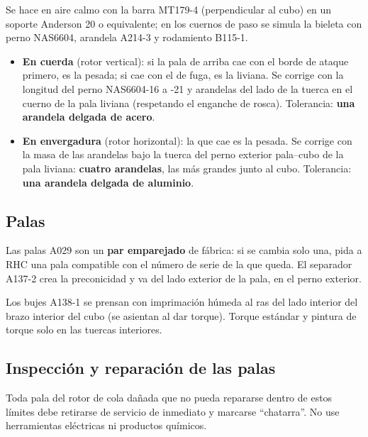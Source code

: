 Se hace en aire calmo con la barra MT179-4 (perpendicular al cubo) en un soporte Anderson 20 o equivalente; en los cuernos de paso se simula la bieleta con perno NAS6604, arandela A214-3 y rodamiento B115-1.

\begin{itemize}
\item \textbf{En cuerda} (rotor vertical): si la pala de arriba cae con el borde de ataque primero, es la pesada; si cae con el de fuga, es la liviana. Se corrige con la longitud del perno NAS6604-16 a -21 y arandelas del lado de la tuerca en el cuerno de la pala liviana (respetando el enganche de rosca). Tolerancia: \textbf{una arandela delgada de acero}.
\item \textbf{En envergadura} (rotor horizontal): la que cae es la pesada. Se corrige con la masa de las arandelas bajo la tuerca del perno exterior pala--cubo de la pala liviana: \textbf{cuatro arandelas}, las más grandes junto al cubo. Tolerancia: \textbf{una arandela delgada de aluminio}.
\end{itemize}

\subsection{Palas}

\begin{precaucion}
Las palas A029 son un \textbf{par emparejado} de fábrica: si se cambia solo una, pida a RHC una pala compatible con el número de serie de la que queda. El separador A137-2 crea la preconicidad y va del lado exterior de la pala, en el perno exterior.
\end{precaucion}

Los bujes A138-1 se prensan con imprimación húmeda al ras del lado interior del brazo interior del cubo (se asientan al dar torque). Torque estándar y pintura de torque solo en las tuercas interiores.


\subsection{Inspección y reparación de las palas}

\begin{advertencia}
Toda pala del rotor de cola dañada que no pueda repararse dentro de estos límites debe retirarse de servicio de inmediato y marcarse ``chatarra''. No use herramientas eléctricas ni productos químicos.
\end{advertencia}

